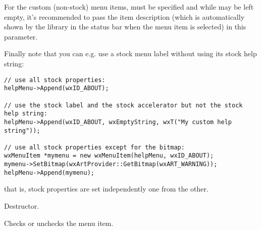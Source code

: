 For the custom (non-stock) menu items,  must be specified and while 
 may be left empty, it's recommended to pass the item
description (which is automatically shown by the library in the status bar when
the menu item is selected) in this parameter.

Finally note that you can e.g. use a stock menu label without using its stock
help string:

\begin{verbatim}
// use all stock properties:
helpMenu->Append(wxID_ABOUT);

// use the stock label and the stock accelerator but not the stock help string:
helpMenu->Append(wxID_ABOUT, wxEmptyString, wxT("My custom help string"));

// use all stock properties except for the bitmap:
wxMenuItem *mymenu = new wxMenuItem(helpMenu, wxID_ABOUT);
mymenu->SetBitmap(wxArtProvider::GetBitmap(wxART_WARNING));
helpMenu->Append(mymenu);
\end{verbatim}

that is, stock properties are set independently one from the other.









\label{wxmenuitemdtor}


Destructor.


\label{wxmenuitemcheck}


Checks or unchecks the menu item.

